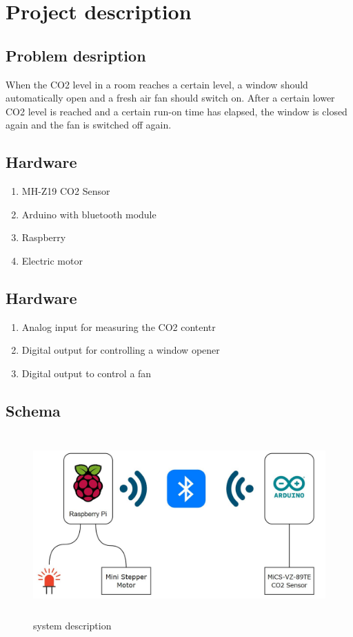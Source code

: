 \section{Project description}
\label{chapter1}

\subsection{Problem desription}

When the CO2 level in a room reaches a certain level, a window should automatically open and a fresh air fan should switch on.
After a certain lower CO2 level is reached and a certain run-on time has elapsed, the window is closed again and the fan is switched off again.

\subsection{Hardware}

\begin{enumerate}[label*=\arabic*.]
    \item \label{hw.1} MH-Z19 CO2 Sensor 
    \item \label{hw.2} Arduino with bluetooth module 
    \item \label{hw.3} Raspberry 
    \item \label{hw.4} Electric motor
\end{enumerate}

\subsection{Hardware}

\begin{enumerate}[label*=\arabic*.]
    \item \label{io.1} Analog input for measuring the CO2 contentr 
    \item \label{io.2} Digital output for controlling a window opener 
    \item \label{io.3} Digital output to control a fan 
\end{enumerate}

\subsection{Schema}

\begin{figure}[h]
	\includegraphics[height=70mm,left]{images/schema_technologien.jpg}
	\centering
	\caption{system description}
	\label{fig:system}
\end{figure}






